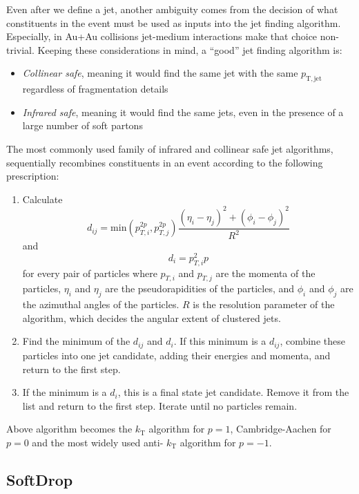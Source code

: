 Even after we define a jet, another ambiguity comes from the decision of what constituents in the event must be used as inputs into the jet finding algorithm. Especially, in Au+Au collisions jet-medium interactions make that choice non-trivial. Keeping these considerations in mind, a ``good'' jet finding algorithm is:
\begin{itemize}
	\item \emph{Collinear safe}, meaning  it would find the same jet with the same \(p_\mathrm{T, jet}\) regardless of  fragmentation details
	\item \emph{Infrared safe}, meaning  it would find the same jets, even in the presence of a
	large number of soft partons
\end{itemize}

The most commonly used family of infrared and collinear safe jet algorithms, sequentially recombines constituents in an event according to the following prescription:

\begin{enumerate} 
	\item Calculate
	\begin{equation}
		d_{ij} = {\mathrm {min}}(p_{T,i}^{2p},p_{T,j}^{2p})\frac{(\eta_i-\eta_j)^2+(\phi_i-\phi_j)^2}{R^2}
	\end{equation}
	and 
	\begin{equation}
		d_{i} = p_{T,i}^2p
	\end{equation}
	for every pair of particles where $p_{T,i}$ and $p_{T,j}$ are the momenta of the particles, $\eta_i$ and $\eta_j$ are the pseudorapidities of the particles, and $\phi_i$ and $\phi_j$ are the azimuthal angles of the particles. \(R\) is the resolution parameter of the algorithm, which decides the angular extent of clustered jets.
	\item Find the minimum of the $d_{ij}$ and $d_{i}$.  If this minimum is a $d_{ij}$, combine these particles into one jet candidate, adding their energies and momenta, and return to the first step.  
	\item If the minimum is a $d_{i}$, this is a final state jet candidate.  Remove it from the list and return to the first step.  Iterate until no particles remain.  
\end{enumerate}

Above algorithm becomes the \(k_\mathrm{T}\) algorithm for \(p=1\), Cambridge-Aachen for \(p=0\) and the most widely used anti- \(k_\mathrm{T}\) algorithm for \(p=-1\). 

\subsection{SoftDrop}

